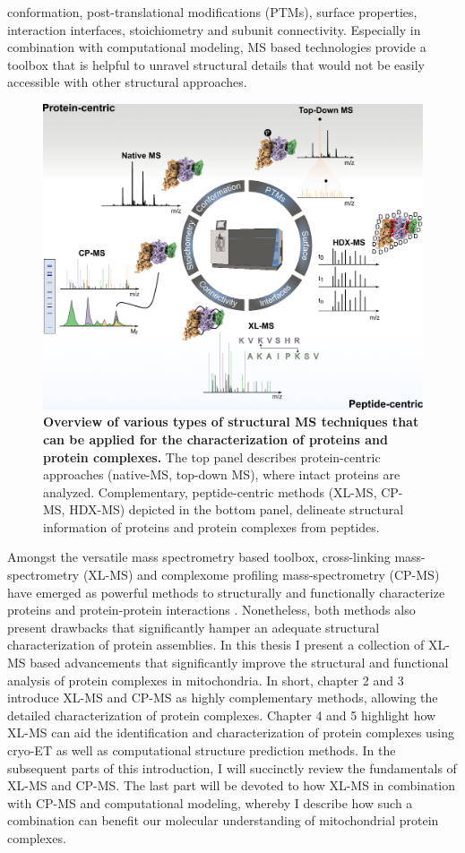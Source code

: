 conformation, post-translational modifications (PTMs), surface properties, interaction interfaces, stoichiometry and subunit connectivity. Especially in combination with computational modeling, MS based technologies provide a toolbox that is helpful to unravel structural details that would not be easily accessible with other structural approaches.

\begin{figure}[hbt!]
    \center
    \includegraphics[]{Chapter.1/Figures/Figure1.png} 
    \caption{\textbf{Overview of various types of structural MS techniques that can be applied for the characterization of proteins and protein complexes.} The top panel describes protein-centric approaches (native-MS, top-down MS), where intact proteins are analyzed. Complementary, peptide-centric methods (XL-MS, CP-MS, HDX-MS) depicted in the bottom panel, delineate structural information of proteins and protein complexes from peptides.}
    \label{fig:fig1}
\end{figure}

Amongst the versatile mass spectrometry based toolbox, cross-linking mass-spectrometry (XL-MS) and complexome profiling mass-spectrometry (CP-MS) have emerged as powerful methods to structurally and functionally characterize proteins and protein-protein interactions \cite{Steigenberger_2020}. Nonetheless, both methods also present drawbacks that significantly hamper an adequate structural characterization of protein assemblies. In this thesis I present a collection of XL-MS based advancements that significantly improve the structural and functional analysis of protein complexes in mitochondria. In short, chapter 2 and 3 introduce XL-MS and CP-MS as highly complementary methods, allowing the detailed characterization of protein complexes. Chapter 4 and 5 highlight how XL-MS can aid the identification and characterization of protein complexes using cryo-ET as well as computational structure prediction methods. In the subsequent parts of this introduction, I will succinctly review the fundamentals of XL-MS and CP-MS. The last part will be devoted to how XL-MS in combination with CP-MS and computational modeling, whereby I describe how such a combination can benefit our molecular understanding of mitochondrial protein complexes.

